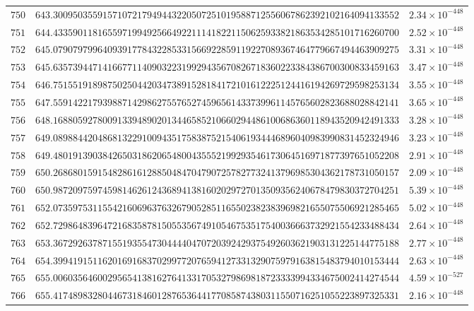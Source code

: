 \documentclass[12pt,reqno]{amsart}
\theoremstyle{remark}
\begin{document}
\begin{longtable}{clc}
$750$ & $643.3009503559157107217949443220507251019588712556067862392102164094133552$ & $2.34\times 10^{-448}$ \\
$751$ & $644.4335901181655971994925664922111418221150625933821863534285101716260700$ & $2.52\times 10^{-448}$ \\
$752$ & $645.0790797996409391778432285331566922859119227089367464779667494463909275$ & $3.31\times 10^{-448}$ \\
$753$ & $645.6357394471416677114090322319929435670826718360223384386700300833459163$ & $3.47\times 10^{-448}$ \\
$754$ & $646.7515519189875025044203473891528184172101612225124416194269729598253134$ & $3.55\times 10^{-448}$ \\
$755$ & $647.5591422179398871429862755765274596561433739961145765602823688028842141$ & $3.65\times 10^{-448}$ \\
$756$ & $648.1688059278009133948902013446585210660294486100686360118943520942491333$ & $3.28\times 10^{-448}$ \\
$757$ & $649.0898844204868132291009435175838752154061934446896040983990831452324946$ & $3.23\times 10^{-448}$ \\
$758$ & $649.4801913903842650318620654800435552199293546173064516971877397651052208$ & $2.91\times 10^{-448}$ \\
$759$ & $650.2686801591548286161288504847047907257827732413796985304362178731050157$ & $2.09\times 10^{-448}$ \\
$760$ & $650.9872097597459814626124368941381602029727013509356240678479830372704251$ & $5.39\times 10^{-448}$ \\
$761$ & $652.0735975311554216069637632679052851165502382383969821655075506921285465$ & $5.02\times 10^{-448}$ \\
$762$ & $652.7298648396472168358781505535674910546753517540036663732921554233488434$ & $2.64\times 10^{-448}$ \\
$763$ & $653.3672926378715519355473044440470720392429375492603621903131225144775188$ & $2.77\times 10^{-448}$ \\
$764$ & $654.3994191511620169168370299772076594127331329075979163815483794010153444$ & $2.63\times 10^{-448}$ \\
$765$ & $655.0060356460029565413816276413317053279869818723333994334675002414274544$ & $4.59\times 10^{-527}$ \\
$766$ & $655.4174898328044673184601287653644177085874380311550716251055223897325331$ & $2.16\times 10^{-448}$ \\

\end{longtable}
\end{document}
